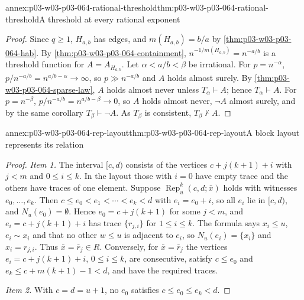 \begin{annexitem}{annex:p03-w03-p03-064-rational-threshold}{thm:p03-w03-p03-064-rational-threshold}{A threshold at every rational exponent}
\begin{proof}
Since \(q\geq1\), \(H_{a,b}\) has edges, and \(m(H_{a,b})=b/a\) by
\cref{thm:p03-w03-p03-064-hab}.  By \cref{thm:p03-w03-p03-064-containment},
\(n^{-1/m(H_{a,b})}=n^{-a/b}\) is a threshold function for
\(A=A_{H_{a,b}}\).  Let \(\alpha<a/b<\beta\) be irrational.  For
\(p=n^{-\alpha}\), \(p/n^{-a/b}=n^{a/b-\alpha}\to\infty\), so
\(p\gg n^{-a/b}\) and \(A\) holds almost surely.  By
\cref{thm:p03-w03-p03-064-sparse-law}, \(A\) holds almost never unless
\(T_\alpha\vdash A\); hence \(T_\alpha\vdash A\).  For \(p=n^{-\beta}\),
\(p/n^{-a/b}=n^{a/b-\beta}\to0\), so \(A\) holds almost never, \(\neg A\)
almost surely, and by the same corollary \(T_\beta\vdash\neg A\).  As
\(T_\beta\) is consistent, \(T_\beta\nvdash A\).
\end{proof}
\end{annexitem}

\begin{annexitem}{annex:p03-w03-p03-064-rep-layout}{thm:p03-w03-p03-064-rep-layout}{A block layout represents its relation}
\begin{proof}
\emph{Item 1.}  The interval \([c,d)\) consists of the vertices
\(c+j(k+1)+i\) with \(j<m\) and \(0\leq i\leq k\).  In the layout those with
\(i=0\) have empty trace and the others have traces of one element.  Suppose
\(\operatorname{Rep}^k_u(c,d;\bar x)\) holds with witnesses
\(e_0,\ldots,e_k\).  Then \(c\leq e_0<e_1<\cdots<e_k<d\) with
\(e_i=e_0+i\), so all \(e_i\) lie in \([c,d)\), and \(N_u(e_0)=\emptyset\).
Hence \(e_0=c+j(k+1)\) for some \(j<m\), and \(e_i=c+j(k+1)+i\) has trace
\(\{r_{j,i}\}\) for \(1\leq i\leq k\).  The formula says \(x_i\leq u\),
\(e_i\sim x_i\) and that no other \(w\leq u\) is adjacent to \(e_i\), so
\(N_u(e_i)=\{x_i\}\) and \(x_i=r_{j,i}\).  Thus \(\bar x=\bar r_j\in R\).
Conversely, for \(\bar x=\bar r_j\) the vertices \(e_i=c+j(k+1)+i\),
\(0\leq i\leq k\), are consecutive, satisfy \(c\leq e_0\) and
\(e_k\leq c+m(k+1)-1<d\), and have the required traces.

\emph{Item 2.}  With \(c=d=u+1\), no \(e_0\) satisfies
\(c\leq e_0\leq e_k<d\).
\end{proof}
\end{annexitem}

